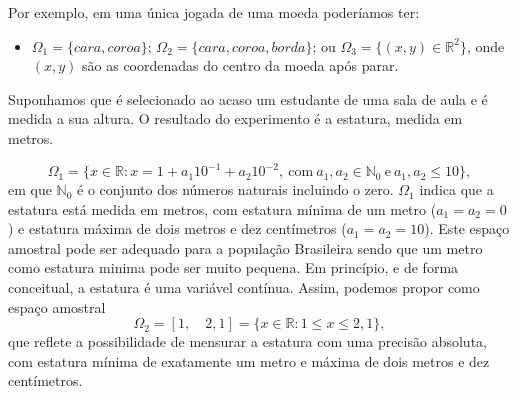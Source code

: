 \begin{frame}
%	
%	

%	
\begin{exem}
	Por exemplo, em uma única jogada de uma moeda poderíamos ter:
	\begin{itemize}
		\item $\Omega_1=\{cara,coroa\}$; $\Omega_2=\{cara,coroa,borda\}$; ou $\Omega_3=\{(x,y)\in \mathbb{R}^2\}$, onde $(x,y)$ são as coordenadas do centro da moeda após parar.
	\end{itemize}
	
	
\end{exem}

\begin{exem}
	Suponhamos que é selecionado ao acaso um estudante de uma sala de aula e é medida a sua altura. O resultado do experimento é a estatura, medida em metros.
	
	$$\Omega_1 = \{ x \in \mathbb{R}: x=1 + a_1 10^{-1} + a_2 10^{-2}, \ \text{com} \ a_1, a_2 \in \mathbb{N}_0 \ \text{e} \  a_1, a_2 \leq 10  \},$$  em que $\mathbb{N}_0$ é o conjunto dos números naturais incluindo o zero.  $\Omega_1$ indica que a estatura está medida em metros, com estatura mínima de um metro ($a_1=a_2=0$) e estatura máxima de dois metros e dez centímetros  ($a_1=a_2=10$). Este espaço amostral pode ser adequado para a população Brasileira sendo que um metro como estatura minima pode ser muito pequena. Em princípio, e de forma conceitual, a estatura é uma variável contínua. Assim, podemos propor como espaço amostral 
	$$\Omega_2 = [1 , \quad 2,1]  = \{ x \in \mathbb{R}: 1\leq x \leq 2,1 \},$$ 
	que reflete a possibilidade de mensurar a estatura com uma precisão absoluta,  com estatura mínima de exatamente um metro e máxima de dois metros e dez centímetros.
\end{exem}

\end{frame}

